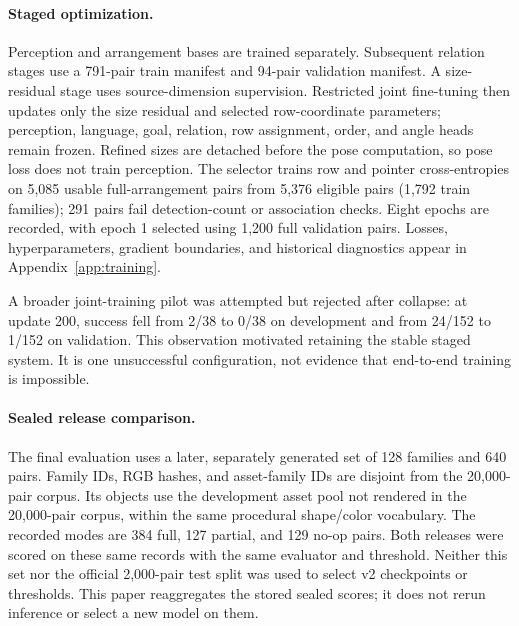 \documentclass{article}
\begin{document}
\paragraph{Staged optimization.}
Perception and arrangement bases are trained separately. Subsequent relation stages use a 791-pair train manifest and 94-pair validation manifest. A size-residual stage uses source-dimension supervision. Restricted joint fine-tuning then updates only the size residual and selected row-coordinate parameters; perception, language, goal, relation, row assignment, order, and angle heads remain frozen. Refined sizes are detached before the pose computation, so pose loss does not train perception. The selector trains row and pointer cross-entropies on 5,085 usable full-arrangement pairs from 5,376 eligible pairs (1,792 train families); 291 pairs fail detection-count or association checks. Eight epochs are recorded, with epoch 1 selected using 1,200 full validation pairs. Losses, hyperparameters, gradient boundaries, and historical diagnostics appear in Appendix~\ref{app:training}.

A broader joint-training pilot was attempted but rejected after collapse: at update 200, success fell from 2/38 to 0/38 on development and from 24/152 to 1/152 on validation. This observation motivated retaining the stable staged system. It is one unsuccessful configuration, not evidence that end-to-end training is impossible.

\paragraph{Sealed release comparison.}
The final evaluation uses a later, separately generated set of 128 families and 640 pairs. Family IDs, RGB hashes, and asset-family IDs are disjoint from the 20,000-pair corpus. Its objects use the development asset pool not rendered in the 20,000-pair corpus, within the same procedural shape/color vocabulary. The recorded modes are 384 full, 127 partial, and 129 no-op pairs. Both releases were scored on these same records with the same evaluator and threshold. Neither this set nor the official 2,000-pair test split was used to select v2 checkpoints or thresholds. This paper reaggregates the stored sealed scores; it does not rerun inference or select a new model on them.
\end{document}
